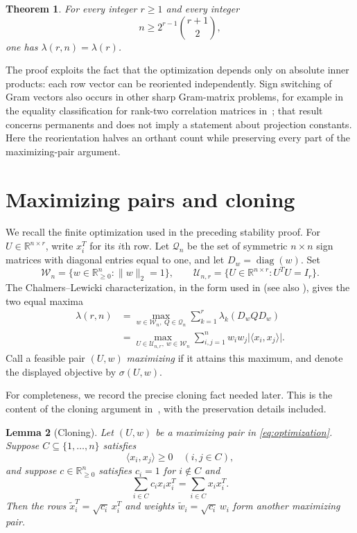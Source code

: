 \documentclass[11pt]{article}
\newtheorem{theorem}{Theorem}[section]
\newtheorem{lemma}[theorem]{Lemma}
\newcommand{\R}{\mathbb{R}}
\newcommand{\ip}[2]{\langle #1,#2\rangle}
\begin{document}
\begin{theorem}\label{thm:main}
For every integer $r\ge1$ and every integer
\[
 n\ge 2^{r-1}\binom{r+1}{2},
\]
one has $\lambda(r,n)=\lambda(r)$.
\end{theorem}

The proof exploits the fact that the optimization depends only on absolute
inner products: each row vector can be reoriented independently.  Sign
switching of Gram vectors also occurs in other sharp Gram-matrix problems,
for example in the equality classification for rank-two correlation
matrices in~\cite{ZengLiuRatnavelu2026}; that result concerns permanents and
does not imply a statement about projection constants.  Here the reorientation
halves an orthant count while preserving every part of the maximizing-pair
argument.

\section{Maximizing pairs and cloning}

We recall the finite optimization used in the preceding stability proof.
For $U\in\R^{n\times r}$, write $x_i^T$ for its $i$th row.  Let
$\mathcal Q_n$ be the set of symmetric $n\times n$ sign matrices with
diagonal entries equal to one, and let $D_w=\operatorname{diag}(w)$.
Set
\[
 \mathcal W_n=\{w\in\R_{\ge0}^n:\lVert w\rVert_2=1\},
 \qquad
 \mathcal U_{n,r}=\{U\in\R^{n\times r}:U^TU=I_r\}.
\]
The Chalmers--Lewicki characterization, in the form used in
\cite[Theorem~2.1]{KumarEtAl2026} (see also
\cite{ChalmersLewicki2010,FoucartSkrzypek2017}), gives the two equal maxima
\begin{align}
 \lambda(r,n)
 &=\max_{w\in\mathcal W_n,\ Q\in\mathcal Q_n}
      \sum_{k=1}^r\lambda_k(D_wQD_w) \label{eq:eigen-optimization}\\
 &=\max_{U\in\mathcal U_{n,r},\ w\in\mathcal W_n}
   \sum_{i,j=1}^n w_iw_j\lvert\ip{x_i}{x_j}\rvert .
   \label{eq:optimization}
\end{align}
Call a feasible pair $(U,w)$ \emph{maximizing} if it attains this maximum,
and denote the displayed objective by $\sigma(U,w)$.

For completeness, we record the precise cloning fact needed later.  This is
the content of the cloning argument in~\cite[Claims~2.1--2.4]{KumarEtAl2026},
with the preservation details included.

\begin{lemma}[Cloning]\label{lem:cloning}
Let $(U,w)$ be a maximizing pair in \eqref{eq:optimization}.  Suppose
$C\subseteq\{1,\ldots,n\}$ satisfies
\[
 \ip{x_i}{x_j}\ge0\quad(i,j\in C),
\]
and suppose $c\in\R_{\ge0}^n$ satisfies $c_i=1$ for $i\notin C$ and
\begin{equation}\label{eq:moment-preserve}
 \sum_{i\in C}c_i x_ix_i^T=\sum_{i\in C}x_ix_i^T.
\end{equation}
Then the rows $\widetilde x_i^T=\sqrt{c_i}\,x_i^T$ and weights
$\widetilde w_i=\sqrt{c_i}\,w_i$ form another maximizing pair.
\end{lemma}
\end{document}
